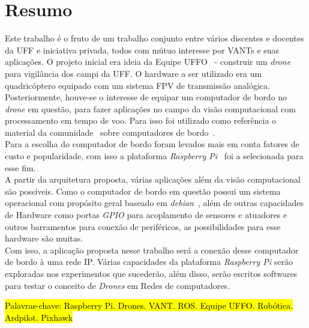 \documentclass[12pt,a4paper,oneside]{book}
\begin{document}
\pagebreak




\chapter*{Resumo}
%
%
\thispagestyle{myheadings}
%
Este trabalho é o fruto de um trabalho conjunto entre vários discentes e docentes da UFF e iniciativa privada, todos com mútuo interesse por VANTs e suas aplicações. O projeto inicial era ideia da Equipe UFFO~\cite{url:equipeuffo} - construir um \textit{drone} para vigilância dos campi da UFF. O hardware a ser utilizado era um quadricóptero equipado com um sistema FPV de transmissão analógica. Posteriormente, houve-se o interesse de equipar um computador de bordo no \textit{drone} em questão, para fazer aplicações no campo da visão computacional com processamento em tempo de voo. Para isso foi utilizado como referência o material da comunidade~\cite{url:ardupilotdoc} sobre computadores de bordo~\cite{url:ardupilot-companioncomputers}.\\
%
Para a escolha do computador de bordo foram levados mais em conta fatores de custo e popularidade, com isso a plataforma \textit{Raspberry Pi}~\cite{url:raspberrypi} foi a selecionada para esse fim.\\
%
A partir da arquitetura proposta, várias aplicações além da visão computacional são possíveis. Como o computador de bordo em questão possui um sistema operacional com propósito geral baseado em \textit{debian}~\cite{url:debian}, além de outras capacidades de Hardware como portas \textit{GPIO} para acoplamento de sensores e atuadores e outros barramentos para conexão de periféricos, as possibilidades para esse hardware são muitas.\\
%
Com isso, a aplicação proposta nesse trabalho será a conexão desse computador de bordo à uma rede IP. Várias capacidades da plataforma \textit{Raspberry Pi} serão exploradas nos experimentos que sucederão, além disso, serão escritos softwares para testar o conceito de \textit{Drones} em Redes de computadores.
%

\bigskip

\hl{ Palavras-chave: Raspberry Pi. Drones. VANT. ROS. Equipe UFFO. Robótica. Ardpilot. Pixhawk}
\end{document}
